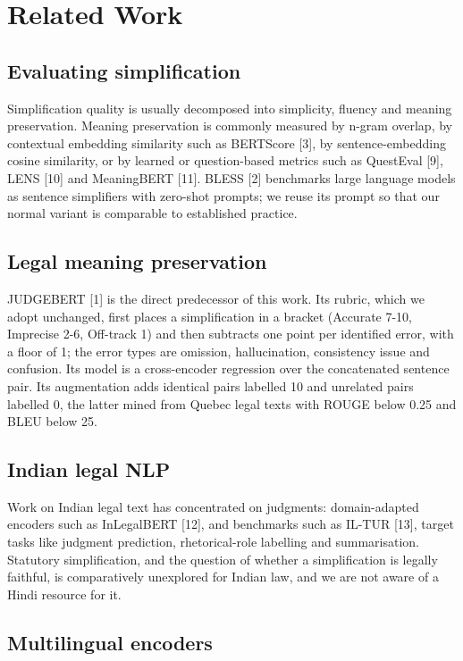 \documentclass[conference]{IEEEtran}
\begin{document}
\section{Related Work}

\subsection{Evaluating simplification}

Simplification quality is usually decomposed into simplicity, fluency and meaning preservation. Meaning preservation is commonly measured by n-gram overlap, by contextual embedding similarity such as BERTScore [3], by sentence-embedding cosine similarity, or by learned or question-based metrics such as QuestEval [9], LENS [10] and MeaningBERT [11]. BLESS [2] benchmarks large language models as sentence simplifiers with zero-shot prompts; we reuse its prompt so that our normal variant is comparable to established practice.

\subsection{Legal meaning preservation}

JUDGEBERT [1] is the direct predecessor of this work. Its rubric, which we adopt unchanged, first places a simplification in a bracket (Accurate 7-10, Imprecise 2-6, Off-track 1) and then subtracts one point per identified error, with a floor of 1; the error types are omission, hallucination, consistency issue and confusion. Its model is a cross-encoder regression over the concatenated sentence pair. Its augmentation adds identical pairs labelled 10 and unrelated pairs labelled 0, the latter mined from Quebec legal texts with ROUGE below 0.25 and BLEU below 25.

\subsection{Indian legal NLP}

Work on Indian legal text has concentrated on judgments: domain-adapted encoders such as InLegalBERT [12], and benchmarks such as IL-TUR [13], target tasks like judgment prediction, rhetorical-role labelling and summarisation. Statutory simplification, and the question of whether a simplification is legally faithful, is comparatively unexplored for Indian law, and we are not aware of a Hindi resource for it.

\subsection{Multilingual encoders}
\end{document}
